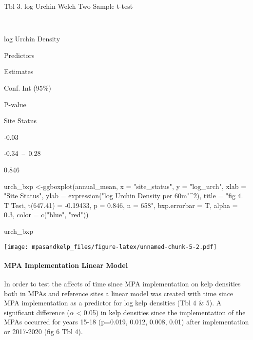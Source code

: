 \documentclass[
]{article}
\newenvironment{Shaded}{\begin{snugshade}}{\end{snugshade}}
\newcommand{\AttributeTok}[1]{\textcolor[rgb]{0.77,0.63,0.00}{#1}}
\newcommand{\DecValTok}[1]{\textcolor[rgb]{0.00,0.00,0.81}{#1}}
\newcommand{\FloatTok}[1]{\textcolor[rgb]{0.00,0.00,0.81}{#1}}
\newcommand{\FunctionTok}[1]{\textcolor[rgb]{0.00,0.00,0.00}{#1}}
\newcommand{\NormalTok}[1]{#1}
\newcommand{\OtherTok}[1]{\textcolor[rgb]{0.56,0.35,0.01}{#1}}
\newcommand{\SpecialCharTok}[1]{\textcolor[rgb]{0.00,0.00,0.00}{#1}}
\newcommand{\StringTok}[1]{\textcolor[rgb]{0.31,0.60,0.02}{#1}}
\begin{document}
Tbl 3. log Urchin Welch Two Sample t-test

~

log Urchin Density

Predictors

Estimates

Conf. Int (95\%)

P-value

Site Status

-0.03

-0.34~--~0.28

0.846

\begin{Shaded}
\begin{Highlighting}[]
\NormalTok{urch\_bxp }\OtherTok{\textless{}{-}}\FunctionTok{ggboxplot}\NormalTok{(annual\_mean, }\AttributeTok{x =} \StringTok{"site\_status"}\NormalTok{, }\AttributeTok{y =} \StringTok{"log\_urch"}\NormalTok{,}
                     \AttributeTok{xlab =} \StringTok{"Site Status"}\NormalTok{, }\AttributeTok{ylab =} \FunctionTok{expression}\NormalTok{(}\StringTok{"log Urchin Density per 60m"}\SpecialCharTok{\^{}}\DecValTok{2}\NormalTok{), }
                     \AttributeTok{title =} \StringTok{"fig 4. T Test, t(647.41) = {-}0.19433, p = 0.846, n = 658"}\NormalTok{,}
                     \AttributeTok{bxp.errorbar =}\NormalTok{ T,}
                     \AttributeTok{alpha =} \FloatTok{0.3}\NormalTok{, }
                     \AttributeTok{color =} \FunctionTok{c}\NormalTok{(}\StringTok{"blue"}\NormalTok{, }\StringTok{"red"}\NormalTok{))}



\NormalTok{urch\_bxp}
\end{Highlighting}
\end{Shaded}

\texttt{[image: mpasandkelp\_files/figure-latex/unnamed-chunk-5-2.pdf]}

\hypertarget{mpa-implementation-linear-model}{%
\paragraph{MPA Implementation Linear
Model}\label{mpa-implementation-linear-model}}

In order to test the affects of time since MPA implementation on kelp
densities both in MPAs and reference sites a linear model was created
with time since MPA implementation as a predictor for log kelp densities
(Tbl 4 \& 5). A significant difference (\(\alpha\) \textless{} 0.05) in
kelp densities since the implementation of the MPAs occurred for years
15-18 (p=0.019, 0.012, 0.008, 0.01) after implementation or 2017-2020
(fig 6 Tbl 4).
\end{document}
